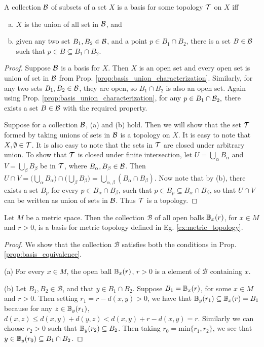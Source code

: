 \documentclass[11pt,a4paper]{article}
\begin{document}
\begin{proposition}\label{prop:basis_equivalence}
A collection $\mathcal{B}$ of subsets of a set $X$ is a basis for some topology $\mathcal{T}$ on $X$ iff
\begin{enumerate}[(a)]
    \item $X$ is the union of all set in $\mathcal{B}$, and
    \item given any two set $B_1, B_2\in \mathcal{B}$, and a point $p\in B_1\cap B_2$, there is a set $B\in \mathcal{B}$ such that $p\in B\subseteq B_1\cap B_2$.
\end{enumerate}
\end{proposition}

\begin{proof}
\forward Suppose $\mathcal{B}$ is a basis for $X$. Then $X$ is an open set and every open set is union of set in $\mathcal{B}$ from Prop. \ref{prop:basis_union_characterization}. Similarly, for any two sets $B_1, B_2\in \mathcal{B}$, they are open, so $B_1\cap B_2$ is also an open set. Again using Prop. \ref{prop:basis_union_characterization}, for any $p\in B_1\cap \mathcal{B}_2,$ there exists a set $B\in \mathcal{B}$ with the required property.

\noindent\converse Suppose for a collection $\mathcal{B}$, (a) and (b) hold. Then we will show that the set $\mathcal{T}$ formed by taking unions of sets in $\mathcal{B}$ is a topology on $X$. It is easy to note that $X,\emptyset\in \mathcal{T}$. It is also easy to note that the sets in $\mathcal{T}$ are closed under arbitrary union. To show that $\mathcal{T}$ is closed under finite intersection, let $U = \bigcup_{\alpha} B_\alpha$ and $V = \bigcup_{\beta}B_\beta$ be in $\mathcal{T}$, where $B_\alpha, B_\beta\in \mathcal{B}$. Then $U\cap V = \Big(\bigcup_{\alpha}B_\alpha\Big) \cap \Big(\bigcup_{\beta}B_\beta\Big) = \bigcup_{\alpha,\beta} (B_\alpha\cap B_\beta)$. Now note that by (b), there exists a set $B_p$ for every $p\in B_\alpha\cap B_\beta$, such that $p\in B_p\subseteq B_\alpha\cap B_\beta$, so that $U\cap V$ can be written as union of sets in $\mathcal{B}$. Thus $\mathcal{T}$ is a topology.
\end{proof}

\begin{proposition}
Let $M$ be a metric space. Then the collection $\mathcal{B}$ of all open balls $\mathbb{B}_x(r)$, for $x\in M$ and $r>0$, is a basis for metric topology defined in Eg. \ref{ex:metric_topology}.
\end{proposition}

\begin{proof}
We show that the collection $\mathcal{B}$ satisfies both the conditions in Prop. \ref{prop:basis_equivalence}.

\noindent(a) For every $x\in M$, the open ball $\mathbb{B}_x(r)$, $r>0$ is a element of $\mathcal{B}$ containing $x$.

\noindent(b) Let $B_1, B_2\in\mathcal{B}$, and that $y\in B_1\cap B_2$. Suppose $B_1 = \mathbb{B}_x(r)$, for some $x\in M$ and $r>0$. Then setting $r_1 = r-d(x,y)>0$, we have that $\mathbb{B}_y(r_1)\subseteq \mathbb{B}_x(r) = B_1$ because for any $z\in \mathbb{B}_y(r_1)$, $d(x,z)\le d(x,y)+d(y,z) < d(x,y) + r - d(x,y) = r$. Similarly we can choose $r_2>0$ such that $\mathbb{B}_y(r_2)\subseteq B_2$. Then taking $r_0 = \text{min}\{r_1,r_2\}$, we see that $y\in \mathbb{B}_y(r_0)\subseteq B_1\cap B_2$.
\end{proof}
\end{document}
